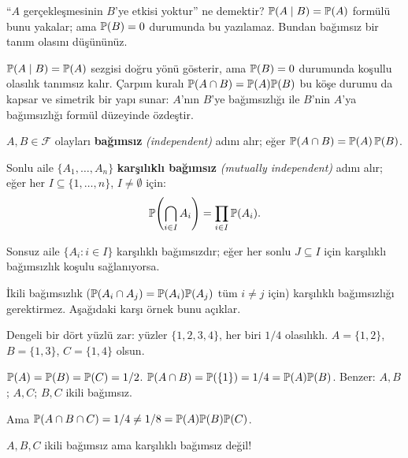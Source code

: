 \begin{kesif}
``$A$ gerçekleşmesinin $B$'ye etkisi yoktur'' ne demektir?
$\mathbb{P}(A \mid B) = \mathbb{P}(A)$ formülü bunu yakalar; ama $\mathbb{P}(B)=0$ durumunda
bu yazılamaz. Bundan bağımsız bir tanım olasını düşününüz.
\end{kesif}

\begin{tanimgerekce}
$\mathbb{P}(A \mid B) = \mathbb{P}(A)$ sezgisi doğru yönü gösterir, ama $\mathbb{P}(B) = 0$
durumunda koşullu olasılık tanımsız kalır. Çarpım kuralı
$\mathbb{P}(A \cap B) = \mathbb{P}(A)\mathbb{P}(B)$ bu köşe durumu da kapsar ve simetrik bir
yapı sunar: $A$'nın $B$'ye bağımsızlığı ile $B$'nin $A$'ya bağımsızlığı
formül düzeyinde özdeştir.
\end{tanimgerekce}

\begin{tanim}\label{def:bagimsiz_olay}
$A, B \in \mathcal{F}$ olayları \textbf{bağımsız} \emph{(independent)} adını alır;
eğer $\mathbb{P}(A \cap B) = \mathbb{P}(A)\,\mathbb{P}(B)$.

Sonlu aile $\{A_1,\ldots,A_n\}$ \textbf{karşılıklı bağımsız}
\emph{(mutually independent)} adını alır; eğer her $I \subseteq \{1,\ldots,n\}$,
$I \neq \emptyset$ için:
\[
  \mathbb{P}\!\left(\bigcap_{i \in I} A_i\right) = \prod_{i \in I} \mathbb{P}(A_i).
\]

Sonsuz aile $\{A_i : i \in I\}$ karşılıklı bağımsızdır; eğer her sonlu
$J \subseteq I$ için karşılıklı bağımsızlık koşulu sağlanıyorsa.
\end{tanim}

\begin{kritiksorgu}
İkili bağımsızlık ($\mathbb{P}(A_i \cap A_j) = \mathbb{P}(A_i)\mathbb{P}(A_j)$ tüm $i \neq j$
için) karşılıklı bağımsızlığı gerektirmez. Aşağıdaki karşı örnek bunu açıklar.
\end{kritiksorgu}

\begin{karsiornek}\label{ex:bernstein}
Dengeli bir dört yüzlü zar: yüzler $\{1,2,3,4\}$, her biri $1/4$ olasılıklı.
$A = \{1,2\}$, $B = \{1,3\}$, $C = \{1,4\}$ olsun.

$\mathbb{P}(A)=\mathbb{P}(B)=\mathbb{P}(C)=1/2$.
$\mathbb{P}(A \cap B) = \mathbb{P}(\{1\}) = 1/4 = \mathbb{P}(A)\mathbb{P}(B)$. Benzer: $A,B$; $A,C$; $B,C$ ikili bağımsız.

Ama $\mathbb{P}(A \cap B \cap C) = 1/4 \neq 1/8 = \mathbb{P}(A)\mathbb{P}(B)\mathbb{P}(C)$.

$A, B, C$ ikili bağımsız ama karşılıklı bağımsız değil!
\end{karsiornek}

